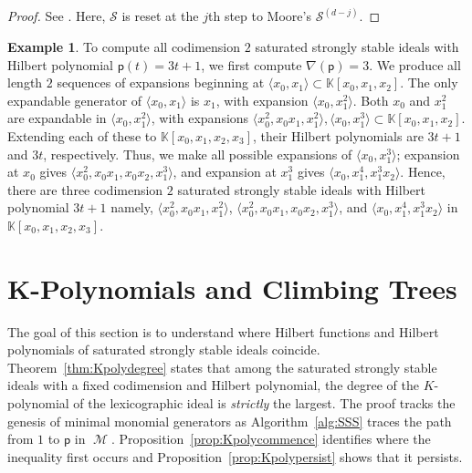 \documentclass[12pt]{amsart}%
\theoremstyle{definition}%
\newtheorem{example}[theorem]{Example}
\DeclareMathOperator{\Macaulaytree}{\mathscr{M}}%
\newcommand{\hp}{\mathsf{p}}%
\newcommand{\kk}{\mathbb{K}}%
\begin{document}
\begin{proof}
  See \cite[Algorithm~3.22]{Moore--2012}.  Here, $\mathcal{S}$ is
  reset at the $j$th step to Moore's $\mathcal{S}^{(d-j)}$.
\end{proof}

\begin{example}
  \label{eg:algorithm}
  To compute all codimension $2$ saturated strongly stable ideals with
  Hilbert polynomial $\hp(t) = 3t + 1$, we first compute $\nabla(\hp)
  = 3$.  We produce all length $2$ sequences of expansions beginning
  at $\langle x_0, x_1 \rangle \subset \kk[x_0, x_1, x_2]$.  The only
  expandable generator of $\langle x_0, x_1 \rangle$ is $x_1$, with
  expansion $\langle x_0, x_1^2 \rangle$.  Both $x_0$ and $x_1^2$ are
  expandable in $\langle x_0, x_1^2 \rangle$, with expansions $\langle
  x_0^2, x_0 x_1, x_1^2 \rangle, \langle x_0, x_1^3 \rangle \subset
  \kk[x_0, x_1, x_2]$.  Extending each of these to $\kk[x_0, x_1, x_2,
    x_3]$, their Hilbert polynomials are $3t + 1$ and $3t$,
  respectively.  Thus, we make all possible expansions of $\langle
  x_0, x_1^3 \rangle$; expansion at $x_0$ gives $\langle x_0^2, x_0
  x_1, x_0 x_2, x_1^3 \rangle$, and expansion at $x_1^3$ gives
  $\langle x_0, x_1^4, x_1^3 x_2 \rangle$.  Hence, there are three
  codimension $2$ saturated strongly stable ideals with Hilbert
  polynomial $3t + 1$ namely, $\langle x_0^2, x_0 x_1, x_1^2 \rangle$,
  $\langle x_0^2, x_0 x_1, x_0 x_2, x_1^3 \rangle$, and $\langle x_0,
  x_1^4, x_1^3 x_2 \rangle$ in $\kk[x_0, x_1, x_2, x_3]$.
\end{example}




\section{K-Polynomials and Climbing Trees}
\label{ch:Kpolynomials}

The goal of this section is to understand where Hilbert functions and
Hilbert polynomials of saturated strongly stable ideals coincide.
Theorem~\ref{thm:Kpolydegree} states that among the saturated strongly
stable ideals with a fixed codimension and Hilbert polynomial, the
degree of the $K$-polynomial of the lexicographic ideal is
\emph{strictly} the largest.  The proof tracks the genesis of minimal
monomial generators as Algorithm~\ref{alg:SSS} traces the path from
$1$ to $\hp$ in $\Macaulaytree$.  Proposition~\ref{prop:Kpolycommence}
identifies where the inequality first occurs and
Proposition~\ref{prop:Kpolypersist} shows that it persists.
\end{document}
